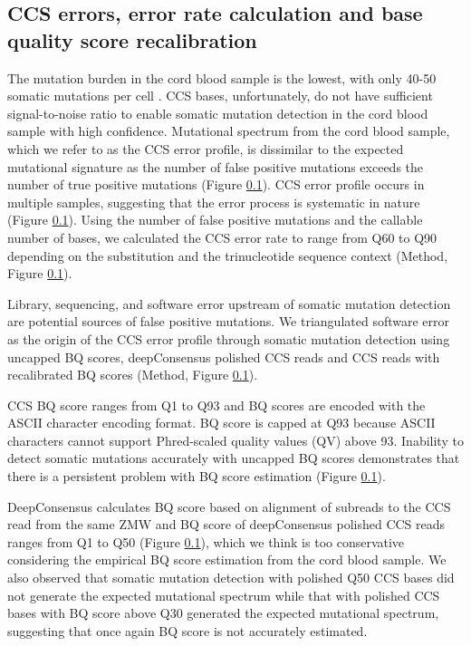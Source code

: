 \subsection{CCS errors, error rate calculation and base quality score recalibration}

The mutation burden in the cord blood sample is the lowest, with only 40-50 somatic mutations per cell \cite{}. CCS bases, unfortunately, do not have sufficient signal-to-noise ratio to enable somatic mutation detection in the cord blood sample with high confidence. Mutational spectrum from the cord blood sample, which we refer to as the CCS error profile, is dissimilar to the expected mutational signature as the number of false positive mutations exceeds the number of true positive mutations (Figure \ref{}). CCS error profile occurs in multiple samples, suggesting that the error process is systematic in nature (Figure \ref{}). Using the number of false positive mutations and the callable number of bases, we calculated the CCS error rate to range from Q60 to Q90 depending on the substitution and the trinucleotide sequence context (Method, Figure \ref{}). 

Library, sequencing, and software error upstream of somatic mutation detection are potential sources of false positive mutations. We triangulated software error as the origin of the CCS error profile through somatic mutation detection using uncapped BQ scores, deepConsensus polished CCS reads \cite{} and CCS reads with recalibrated BQ scores (Method, Figure \ref{}). 

CCS BQ score ranges from Q1 to Q93 and BQ scores are encoded with the ASCII character encoding format. BQ score is capped at Q93 because ASCII characters cannot support Phred-scaled quality values (QV) above 93. Inability to detect somatic mutations accurately with uncapped BQ scores demonstrates that there is a persistent problem with BQ score estimation (Figure \ref{}). 

DeepConsensus calculates BQ score based on alignment of subreads to the CCS read from the same ZMW and BQ score of deepConsensus polished CCS reads ranges from Q1 to Q50 (Figure \ref{}), which we think is too conservative considering the empirical BQ score estimation from the cord blood sample. We also observed that somatic mutation detection with polished Q50 CCS bases did not generate the expected mutational spectrum while that with polished CCS bases with BQ score above Q30 generated the expected mutational spectrum, suggesting that once again BQ score is not accurately estimated. 

